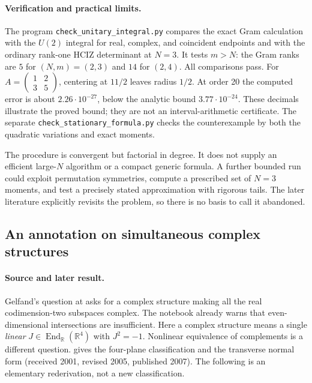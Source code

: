 \paragraph{Verification and practical limits.}
The program \texttt{check\_\allowbreak{}unitary\_\allowbreak{}integral.py} compares the exact
Gram calculation with the \(U(2)\) integral for real, complex, and
coincident endpoints and with the ordinary rank-one HCIZ determinant
at \(N=3\). It tests \(m>N\): the Gram ranks are \(5\) for
\((N,m)=(2,3)\) and \(14\) for \((2,4)\).
All comparisons pass.
For \(A=\left(\begin{smallmatrix}1&2\\3&5\end{smallmatrix}\right)\),
centering at \(11/2\) leaves radius \(1/2\).
At order 20 the computed error is about \(2.26\cdot10^{-27}\),
below the analytic bound \(3.77\cdot10^{-24}\).
These decimals illustrate the proved bound; they are not an
interval-arithmetic certificate.
The separate \texttt{check\_\allowbreak{}stationary\_\allowbreak{}formula.py} checks the
counterexample by both the quadratic variations and exact moments.

The procedure is convergent but factorial in degree. It does not
supply an efficient large-\(N\) algorithm or a compact generic
formula. A further bounded run could exploit permutation symmetries,
compute a prescribed set of \(N=3\) moments, and test a precisely
stated approximation with rigorous tails. The later literature
explicitly revisits the problem, so there is no basis to call it
abandoned.

\subsection{An annotation on simultaneous complex structures}
\label{dev:complex}

\paragraph{Source and later result.}
Gelfand's question at  asks for a complex structure
making all the real codimension-two subspaces complex. The notebook
already warns that even-dimensional intersections are insufficient.
Here a complex structure means a single \emph{linear}
\(J\in\operatorname{End}_{\mathbb R}(\mathbb R^4)\) with \(J^2=-1\).
Nonlinear equivalence of complements is a different question.
\citet[Theorems~1 and~3]{batzies2007planes} gives the four-plane
classification and the transverse normal form (received 2001,
revised 2005, published 2007). The following is an elementary
rederivation, not a new classification.

